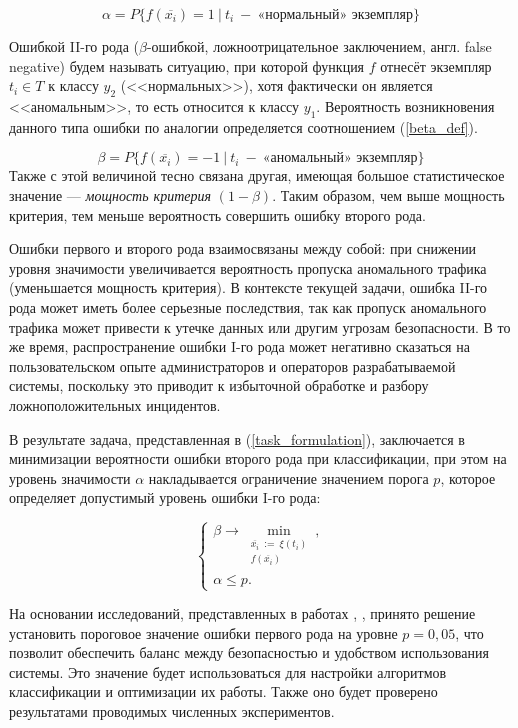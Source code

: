 \begin{equation}\label{alpha_def}
    \alpha = P \Big\{ f(\overline{x_i}) = 1 \ \Big|\ t_i\ -\ \text{«нормальный» экземпляр} \Big\}
\end{equation}

Ошибкой II-го рода ($\beta$-ошибкой, ложноотрицательное заключением, англ. false negative) будем называть ситуацию, при которой функция $f$ отнесёт экземпляр $t_i \in T$ к классу $y_2$ (<<нормальных>>), хотя фактически он является <<аномальным>>, то есть относится к классу $y_1$. Вероятность возникновения данного типа ошибки по аналогии определяется соотношением (\ref{beta_def}).

\begin{equation}\label{beta_def}
    \beta = P \Big\{ f(\overline{x_i}) = -1 \ \Big|\ t_i\ -\ \text{«аномальный» экземпляр} \Big\}
\end{equation}
Также с этой величиной тесно связана другая, имеющая большое статистическое значение --- \textit{мощность критерия} $(1 - \beta)$. Таким образом, чем выше мощность критерия, тем меньше вероятность совершить ошибку второго рода.

Ошибки первого и второго рода взаимосвязаны между собой: при снижении уровня значимости увеличивается вероятность пропуска аномального трафика (уменьшается мощность критерия). В контексте текущей задачи, ошибка II-го рода может иметь более серьезные последствия, так как пропуск аномального трафика может привести к утечке данных или другим угрозам безопасности. В то же время, распространение ошибки I-го рода может негативно сказаться на пользовательском опыте администраторов и операторов разрабатываемой системы, поскольку это приводит к избыточной обработке и разбору ложноположительных инцидентов.

В результате задача, представленная в (\ref{task_formulation}),  заключается в минимизации вероятности ошибки второго рода при классификации, при этом на уровень значимости $\alpha$ накладывается ограничение значением порога $p$, которое определяет допустимый уровень ошибки I-го рода:

\begin{equation}\label{task_formulation}
    \begin{cases}
         \beta \rightarrow \min\limits_{
            \substack{
                \overline{x_i}\ :=\ \xi(t_i) \\
                f(\overline{x_i})
            }
        },
        \\
        \alpha \leq p.
    \end{cases}
\end{equation}

На основании исследований, представленных в работах \cite{Threshold-Adaptation}, \cite{Vasilyev-IS}, \cite{Detect-Anomalies-Deep-NN} принято решение установить пороговое значение ошибки первого рода на уровне $p = 0,05$, что позволит обеспечить баланс между безопасностью и удобством использования системы. Это значение будет использоваться для настройки алгоритмов классификации и оптимизации их работы. Также оно будет проверено результатами проводимых численных экспериментов.

